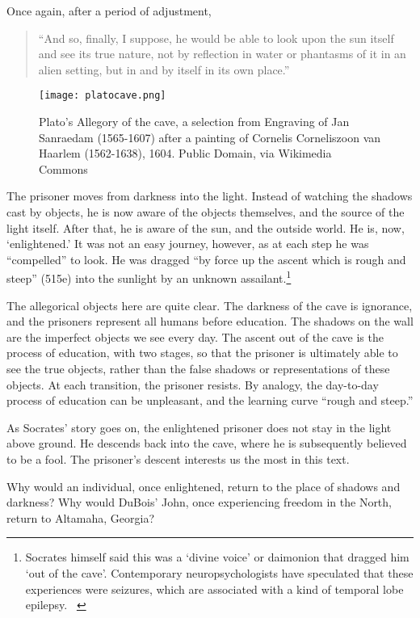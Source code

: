 Once again, after a period of adjustment,

\begin{quote}

``And so, finally, I suppose, he would be able to look upon the sun itself and see its true nature, not by reflection in water or phantasms of it in an alien setting, but in and by itself in its own place.'' ~\citep[516b]{Plato:1994ug}
\end{quote}

\begin{figure*}\texttt{[image: platocave.png]}\caption{Plato's Allegory of the cave, a selection from Engraving of Jan Sanraedam (1565-1607) after a painting of Cornelis Corneliszoon van Haarlem (1562-1638), 1604. Public Domain, via Wikimedia Commons}\label{fig:platocave}\end{figure*}The prisoner moves from darkness into the light. Instead of watching the shadows cast by objects, he is now aware of the objects themselves, and the source of the light itself. After that, he is aware of the sun, and the outside world. He is, now, `enlightened.' It was not an easy journey, however, as at each step he was ``compelled'' to look. He was dragged ``by force up the ascent which is rough and steep'' (515e) into the sunlight by an unknown assailant.\footnote{Socrates himself said this was a `divine voice' or daimonion that dragged him `out of the cave'. Contemporary neuropsychologists have speculated that these experiences were seizures, which are associated with a kind of temporal lobe epilepsy. ~\citep{Muramoto:2006fw}}

The allegorical objects here are quite clear. The darkness of the cave is ignorance, and the prisoners represent all humans before education. The shadows on the wall are the imperfect objects we see every day. The ascent out of the cave is the process of education, with two stages, so that the prisoner is ultimately able to see the true objects, rather than the false shadows or representations of these objects. At each transition, the prisoner resists. By analogy, the day-to-day process of education can be unpleasant, and the learning curve ``rough and steep.'' 

As Socrates' story goes on, the enlightened prisoner does not stay in the light above ground. He descends back into the cave, where he is subsequently believed to be a fool. The prisoner's descent interests us the most in this text. \begin{question}Why would an individual, once enlightened, return to the place of shadows and darkness? Why would DuBois' John, once experiencing freedom in the North, return to Altamaha, Georgia?
\end{question}

